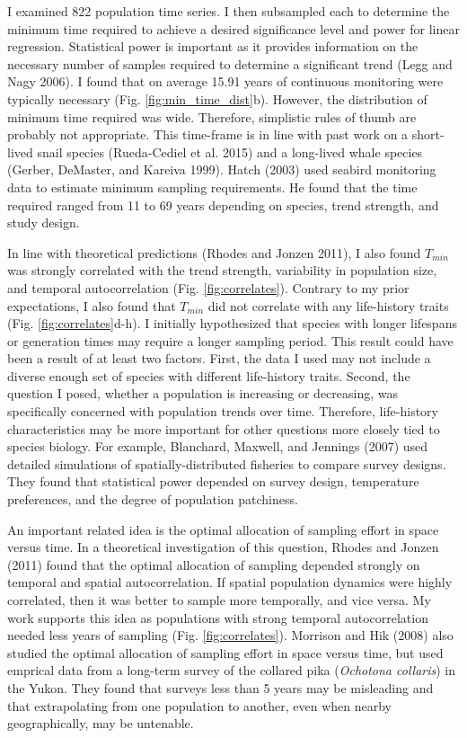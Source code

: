 \documentclass[12pt,]{article}
\begin{document}
I examined 822 population time series. I then subsampled each to
determine the minimum time required to achieve a desired significance
level and power for linear regression. Statistical power is important as
it provides information on the necessary number of samples required to
determine a significant trend (Legg and Nagy 2006). I found that on
average 15.91 years of continuous monitoring were typically necessary
(Fig. \ref{fig:min_time_dist}b). However, the distribution of minimum
time required was wide. Therefore, simplistic rules of thumb are
probably not appropriate. This time-frame is in line with past work on a
short-lived snail species (Rueda-Cediel et al. 2015) and a long-lived
whale species (Gerber, DeMaster, and Kareiva 1999). Hatch (2003) used
seabird monitoring data to estimate minimum sampling requirements. He
found that the time required ranged from 11 to 69 years depending on
species, trend strength, and study design.

In line with theoretical predictions (Rhodes and Jonzen 2011), I also
found \(T_{min}\) was strongly correlated with the trend strength,
variability in population size, and temporal autocorrelation (Fig.
\ref{fig:correlates}). Contrary to my prior expectations, I also found
that \(T_{min}\) did not correlate with any life-history traits (Fig.
\ref{fig:correlates}d-h). I initially hypothesized that species with
longer lifespans or generation times may require a longer sampling
period. This result could have been a result of at least two factors.
First, the data I used may not include a diverse enough set of species
with different life-history traits. Second, the question I posed,
whether a population is increasing or decreasing, was specifically
concerned with population trends over time. Therefore, life-history
characteristics may be more important for other questions more closely
tied to species biology. For example, Blanchard, Maxwell, and Jennings
(2007) used detailed simulations of spatially-distributed fisheries to
compare survey designs. They found that statistical power depended on
survey design, temperature preferences, and the degree of population
patchiness.

An important related idea is the optimal allocation of sampling effort
in space versus time. In a theoretical investigation of this question,
Rhodes and Jonzen (2011) found that the optimal allocation of sampling
depended strongly on temporal and spatial autocorrelation. If spatial
population dynamics were highly correlated, then it was better to sample
more temporally, and vice versa. My work supports this idea as
populations with strong temporal autocorrelation needed less years of
sampling (Fig. \ref{fig:correlates}). Morrison and Hik (2008) also
studied the optimal allocation of sampling effort in space versus time,
but used emprical data from a long-term survey of the collared pika
(\emph{Ochotona collaris}) in the Yukon. They found that surveys less
than 5 years may be misleading and that extrapolating from one
population to another, even when nearby geographically, may be
untenable.
\end{document}
